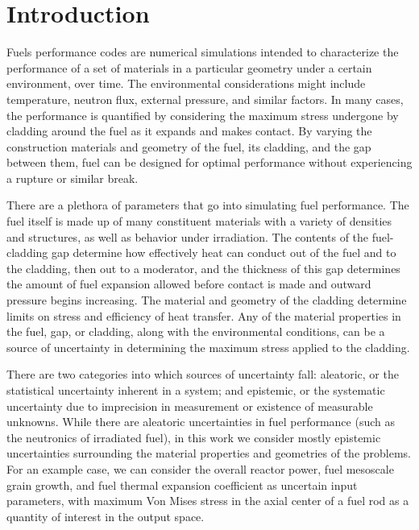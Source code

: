 
\chapter{Introduction} %

\label{ch:intro} %




Fuels performance codes are numerical simulations intended to characterize the performance of a set of
materials in a particular geometry under a certain environment, over time.  The environmental considerations
might include temperature, neutron flux, external pressure, and similar factors.  In many cases, the
performance is quantified by considering the maximum stress undergone by cladding around the fuel as it
expands and makes contact.  By varying the construction materials and geometry of the fuel, its cladding, and
the gap between them, fuel can be designed for optimal performance without experiencing a rupture or similar
break.

There are a plethora of parameters that go into simulating fuel performance.  The fuel itself is made up of
many constituent materials with a variety of densities and structures, as well as behavior under irradiation.
The contents of the fuel-cladding gap determine how effectively heat can conduct out of the fuel and to the
cladding, then out to a moderator, and the thickness of this gap determines the amount of fuel expansion
allowed before contact is made and outward pressure begins increasing.  The material and geometry of the
cladding determine limits on stress and efficiency of heat transfer.  Any of the material properties in the
fuel, gap, or cladding, along with the environmental conditions, can be a source of uncertainty in determining
the maximum stress applied to the cladding.

There are two categories into which sources of uncertainty fall: aleatoric, or the statistical uncertainty inherent in a
system; and epistemic, or the systematic uncertainty due to imprecision in measurement or existence of
measurable unknowns.  While there are aleatoric uncertainties in fuel performance (such as the neutronics of
irradiated fuel), in this work we consider mostly epistemic uncertainties surrounding the material properties
and geometries of the problems.  For an example case, we can consider the overall reactor power, fuel mesoscale
grain growth, and fuel thermal expansion coefficient as uncertain input parameters, with maximum Von Mises stress in the 
axial center of a fuel rod as a quantity of interest in the output space.

